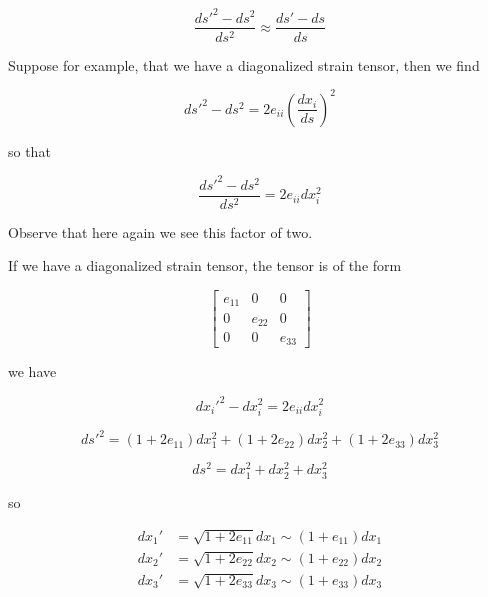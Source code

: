 \begin{equation}\label{eqn:continuumL3:50}
\frac{{ds'}^2 - ds^2 }{ds^2}
\approx
\frac{ds' - ds }{ds}
\end{equation}

Suppose for example, that we have a diagonalized strain tensor, then we find

\begin{equation}\label{eqn:continuumL3:70}
{ds'}^2 - ds^2 
= 2 e_{ii} \left(\frac{dx_i}{ds}\right)^2
\end{equation}

so that

\begin{equation}\label{eqn:continuumL3:90}
\frac{
{ds'}^2 - ds^2 
}{ds^2}
= 2 e_{ii} dx_i^2
\end{equation}

Observe that here again we see this factor of two.

If we have a diagonalized strain tensor, the tensor is of the form

\begin{equation}\label{eqn:continuumL3:110}
\begin{bmatrix}
e_{11} & 0 & 0 \\
0 & e_{22} & 0 \\
0 & 0 & e_{33} 
\end{bmatrix}
\end{equation}

we have

\begin{equation}\label{eqn:continuumL3:130}
{dx_i'}^2 - dx_i^2 = 2 e_{ii} dx_i^2
\end{equation}

\begin{equation}\label{eqn:continuumL3:150}
{ds'}^2 = 
(1 + 2 e_{11}) dx_1^2
+(1 + 2 e_{22}) dx_2^2
+(1 + 2 e_{33}) dx_3^2
\end{equation}

\begin{equation}\label{eqn:continuumL3:170}
ds^2 = 
dx_1^2
+dx_2^2
+dx_3^2
\end{equation}

so 

\begin{align}\label{eqn:continuumL3:190}
dx_1' &= \sqrt{1 + 2 e_{11}} dx_1 \sim ( 1 + e_{11}) dx_1 \\
dx_2' &= \sqrt{1 + 2 e_{22}} dx_2 \sim ( 1 + e_{22}) dx_2 \\
dx_3' &= \sqrt{1 + 2 e_{33}} dx_3 \sim ( 1 + e_{33}) dx_3
\end{align}

